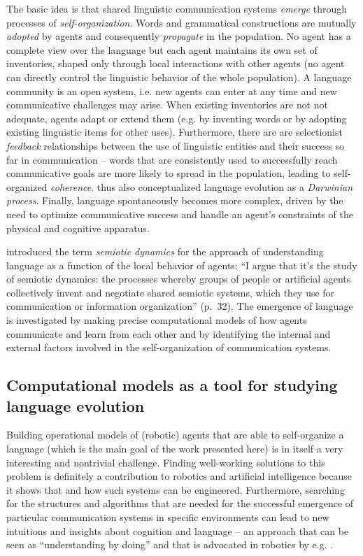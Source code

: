 The basic idea is that shared linguistic communication systems
\emph{emerge} through processes of \emph{self-organization}. Words and
grammatical constructions are mutually \emph{adopted} by agents and
consequently \emph{propagate} in the population. No agent has a
complete view over the language but each agent maintains its own set
of inventories, shaped only through local interactions with other
agents (no agent can directly control the linguistic behavior of the
whole population). A language community is an open system, i.e. new
agents can enter at any time and new communicative challenges may
arise. When existing inventories are not not adequate, agents adapt or
extend them (e.g. by inventing words or by adopting existing
linguistic items for other uses). Furthermore, there are are
selectionist \emph{feedback} relationships between the use of
linguistic entities and their success so far in communication -- words
that are consistently used to successfully reach communicative goals
are more likely to spread in the population, leading to self-organized
\emph{coherence}. \cite{oudeyer07language} thus also conceptualized
language evolution as a \emph{Darwinian process}. Finally, language
spontaneously becomes more complex, driven by the need to optimize
communicative success and handle an agent's constraints of the
physical and cognitive apparatus.

\cite{steels06semiotic} introduced the term \emph{semiotic dynamics}
for the approach of understanding language as a function of the local
behavior of agents: ``I argue that it's the study of semiotic
dynamics: the processes whereby groups of people or artificial agents
collectively invent and negotiate shared semiotic systems, which they
use for communication or information organization'' (p.~32). The
emergence of language is investigated by making precise computational
models of how agents communicate and learn from each other and by
identifying the internal and external factors involved in the
self-organization of communication systems.






\subsection{Computational models as a tool for studying language
  evolution}

Building operational models of (robotic) agents that are able to
self-organize a language (which is the main goal of the work presented
here) is in itself a very interesting and nontrivial
challenge. Finding well-working solutions to this problem is
definitely a contribution to robotics and artificial intelligence
because it shows that and how such systems can be
engineered. Furthermore, searching for the structures and algorithms
that are needed for the successful emergence of particular
communication systems in specific environments can lead to new
intuitions and insights about cognition and language -- an approach
that can be seen as ``understanding by doing'' and that is advocated
in robotics by e.g. \cite{pfeifer06how}.

